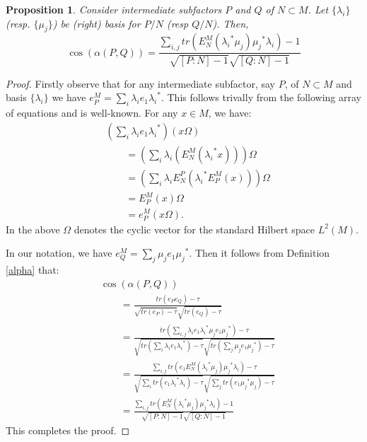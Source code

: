 \documentclass[11pt,letterpaper]{amsart}
\newtheorem{proposition}[theorem]{Proposition}
\theoremstyle{definition}
\theoremstyle{remark}
\begin{document}
\begin{proposition}\label{basis}
 Consider intermediate subfactors $P$ and $Q$ of $N\subset M$. Let $\{\lambda_i\}$(resp. $\{\mu_j\}$) be (right) basis
  for $P/N$ (resp $Q/N$). Then,
 \begin{equation}
  \cos(\alpha(P,Q))= \displaystyle \frac{\sum_{i,j} tr(E^M_N({\lambda_i}^*\mu_j) {\mu_j}^*\lambda_i)-1}{\sqrt{[P:N]-1}  \sqrt{[Q:N]- 1}}
 \end{equation}
 \end{proposition}
 \begin{proof}
  Firstly observe that for any intermediate subfactor, say $P$, of $N\subset M$ and basis $\{\lambda_i\}$ we have $e^M_P= \sum_i {\lambda_i}e_1 {\lambda_i}^*$. This follows trivally from the following array of equations and is well-known. For any $x\in M$, we have:
  \begin{align*}
   & (\sum_i \lambda_i e_1 {\lambda_i}^*)(x\Omega)\\
   & \qquad = (\sum_i {\lambda}_i (E^M_N({\lambda_i}^*x)))\Omega\\
   & \qquad = (\sum_i {\lambda}_i E^P_N({\lambda_i}^*E^M_P(x))) \Omega\\
   & \qquad = E^M_P(x) \Omega\\
   & \qquad = e^M_P(x\Omega).
   \end{align*}
In the above $\Omega$ denotes the cyclic vector for  the standard Hilbert space $L^2(M).$

In our notation, we have $e^M_Q= \sum_j \mu_j e_1 {{\mu}_j}^*$. Then it follows from Definition \ref{alpha} that:
\begin{align*}
 & \cos(\alpha(P,Q))\\
 & \qquad= \displaystyle \frac{tr(e_Pe_Q)- \tau}{\sqrt{tr(e_P)-\tau}\sqrt{tr(e_Q)-\tau}}\\
 & \qquad = \displaystyle \frac{tr(\sum_{i,j} {\lambda}_i e_1 {\lambda_i}^* \mu_j e_1 {\mu_j}^*)-\tau}{\sqrt{tr(\sum_i {\lambda}_i e_1 {{\lambda}_i}^*)- \tau}\sqrt{tr(\sum_j\mu_j e_1 {\mu_j}^*)-\tau}}\\
 & \qquad = \displaystyle \frac{\sum_{i,j} tr(e_1 E^M_N({\lambda_i}^*\mu_j) {\mu_j}^*\lambda_i)-\tau}{\sqrt{\sum_i tr(e_1  {\lambda_i}^*\lambda_i)- \tau} \sqrt{\sum_j tr(e_1  {\mu_j}^*\mu_j)- \tau}}\\
 & \qquad = \displaystyle \frac{\sum_{i,j} tr(E^M_N({\lambda_i}^*\mu_j) {\mu_j}^*\lambda_i)-1}{\sqrt{[P:N]-1}  \sqrt{[Q:N]- 1}}
 \end{align*}
This completes the proof.
 \end{proof}
\end{document}
